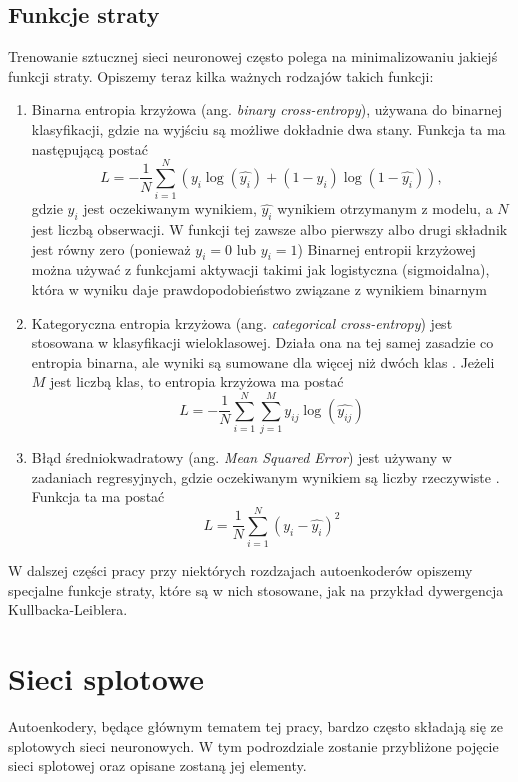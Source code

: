 \documentclass[12pt]{mwbk}
\theoremstyle{plain}
\theoremstyle{definition}
\theoremstyle{remark}
\begin{document}
\subsection{Funkcje straty}

Trenowanie sztucznej sieci neuronowej często polega na minimalizowaniu jakiejś funkcji straty. Opiszemy teraz kilka ważnych rodzajów takich funkcji:
\begin{enumerate}
	\item Binarna entropia krzyżowa (ang. \emph{binary cross-entropy}), używana do binarnej klasyfikacji, gdzie na wyjściu są możliwe dokładnie dwa stany\cite{programmathically}. Funkcja ta ma następującą postać
	$$L=-\frac{1}{N}\sum_{i=1}^N(y_i \log(\hat{y_i})+(1-y_i)\log(1-\hat{y_i})),$$
	gdzie $y_i$ jest oczekiwanym wynikiem,  $\hat{y_i}$ wynikiem otrzymanym z modelu, a $N$ jest liczbą obserwacji. W funkcji tej zawsze albo pierwszy albo drugi składnik jest równy zero (ponieważ $y_i=0$ lub $y_i=1$) Binarnej entropii krzyżowej można używać z funkcjami aktywacji takimi jak logistyczna (sigmoidalna), która w wyniku daje prawdopodobieństwo związane z wynikiem binarnym
	\item Kategoryczna entropia krzyżowa (ang. \emph{categorical cross-entropy}) jest stosowana w klasyfikacji wieloklasowej. Działa ona na tej samej zasadzie co entropia binarna, ale wyniki są sumowane dla więcej niż dwóch klas \cite{programmathically}. Jeżeli $M$ jest liczbą klas, to entropia krzyżowa ma postać
	$$L=-\frac{1}{N}\sum_{i=1}^N\sum_{j=1}^M y_{ij}\log(\hat{y_{ij}})$$
	\item Błąd średniokwadratowy (ang. \emph{Mean Squared Error}) jest używany w zadaniach regresyjnych, gdzie oczekiwanym wynikiem są liczby rzeczywiste \cite{programmathically}. Funkcja ta ma postać
	$$L=\frac{1}{N}\sum_{i=1}^N(y_i-\hat{y_i})^2$$
\end{enumerate}
W dalszej części pracy przy niektórych rozdzajach autoenkoderów opiszemy specjalne funkcje straty, które są w nich stosowane, jak na przykład dywergencja Kullbacka-Leiblera.


\section{Sieci splotowe}

Autoenkodery, będące głównym tematem tej pracy, bardzo często składają się ze splotowych sieci neuronowych. W tym podrozdziale zostanie przybliżone pojęcie sieci splotowej oraz opisane zostaną jej elementy.
\end{document}
